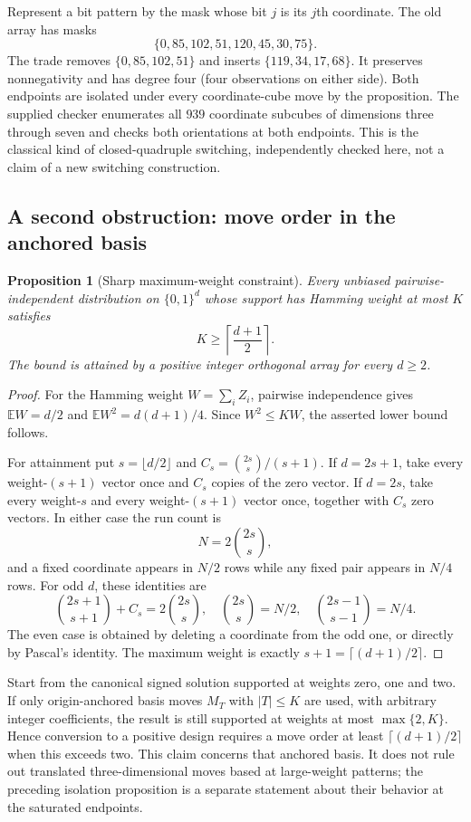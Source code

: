 \documentclass[11pt]{article}
\newtheorem{proposition}{Proposition}[section]
\begin{document}
Represent a bit pattern by the mask whose bit $j$ is its $j$th coordinate.
The old array has masks
\[
 \{0,85,102,51,120,45,30,75\}.
\]
The trade removes $\{0,85,102,51\}$ and inserts
$\{119,34,17,68\}$. It preserves nonnegativity and has degree four
(four observations on either side). Both endpoints are isolated under
every coordinate-cube move by the proposition. The supplied checker
enumerates all $939$ coordinate subcubes of dimensions three through
seven and checks both orientations at both endpoints. This is the
classical kind of closed-quadruple switching, independently checked here,
not a claim of a new switching construction.

\subsection{A second obstruction: move order in the anchored basis}
\begin{proposition}[Sharp maximum-weight constraint]
Every unbiased pairwise-independent distribution on $\{0,1\}^d$ whose
support has Hamming weight at most $K$ satisfies
\[
 K\ge\left\lceil\frac{d+1}{2}\right\rceil.
\]
The bound is attained by a positive integer orthogonal array for every
$d\ge2$.
\end{proposition}
\begin{proof}
For the Hamming weight $W=\sum_i Z_i$, pairwise independence gives
$\mathbb EW=d/2$ and $\mathbb EW^2=d(d+1)/4$. Since $W^2\le KW$,
the asserted lower bound follows.

For attainment put $s=\lfloor d/2\rfloor$ and
$C_s=\binom{2s}{s}/(s+1)$. If $d=2s+1$, take every weight-$(s+1)$
vector once and $C_s$ copies of the zero vector. If $d=2s$, take every
weight-$s$ and every weight-$(s+1)$ vector once, together with $C_s$
zero vectors. In either case the run count is
\[
 N=2\binom{2s}{s},
\]
and a fixed coordinate appears in $N/2$ rows while any fixed pair
appears in $N/4$ rows. For odd $d$, these identities are
\[
 \binom{2s+1}{s+1}+C_s=2\binom{2s}{s},\quad
 \binom{2s}{s}=N/2,\quad
 \binom{2s-1}{s-1}=N/4.
\]
The even case is obtained by deleting a coordinate from the odd one,
or directly by Pascal's identity. The maximum weight is exactly
$s+1=\lceil(d+1)/2\rceil$.
\end{proof}

Start from the canonical signed solution supported at weights zero,
one and two. If only origin-anchored basis moves $M_T$ with $|T|\le K$
are used, with arbitrary integer coefficients, the result is still
supported at weights at most $\max\{2,K\}$. Hence conversion to a positive
design requires a move order at least $\lceil(d+1)/2\rceil$ when this
exceeds two. This claim concerns that anchored basis. It does not rule
out translated three-dimensional moves based at large-weight patterns;
the preceding isolation proposition is a separate statement about their
behavior at the saturated endpoints.
\end{document}

